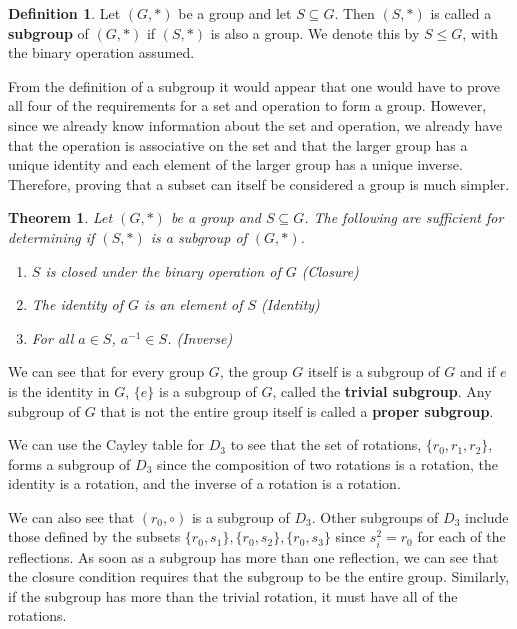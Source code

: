 \documentclass[
]{book}
\providecommand{\tightlist}{%
  \setlength{\itemsep}{0pt}\setlength{\parskip}{0pt}}
\newtheorem{theorem}{Theorem}[chapter]
\theoremstyle{definition}
\newtheorem{definition}{Definition}[chapter]
\theoremstyle{definition}
\theoremstyle{definition}
\theoremstyle{definition}
\theoremstyle{remark}
\begin{document}
\begin{definition}
Let \((G,*)\) be a group and let \(S\subseteq G\). Then \((S,*)\) is called a \textbf{subgroup} of \((G,*)\) if \((S,*)\) is also a group. We denote this by \(S \leq G\), with the binary operation assumed.
\end{definition}

From the definition of a subgroup it would appear that one would have to prove all four of the requirements for a set and operation to form a group. However, since we already know information about the set and operation, we already have that the operation is associative on the set and that the larger group has a unique identity and each element of the larger group has a unique inverse. Therefore, proving that a subset can itself be considered a group is much simpler.

\begin{theorem}

Let \((G,*)\) be a group and \(S \subseteq G\). The following are sufficient for determining if \((S,*)\) is a subgroup of \((G,*)\).

\begin{enumerate}
\def\labelenumi{\arabic{enumi}.}
\tightlist
\item
  \(S\) is closed under the binary operation of \(G\) (Closure)
\item
  The identity of \(G\) is an element of \(S\) (Identity)
\item
  For all \(a\in S\), \(a^{-1}\in S\). (Inverse)
\end{enumerate}

\end{theorem}

We can see that for every group \(G\), the group \(G\) itself is a subgroup of \(G\) and if \(e\) is the identity in \(G\), \(\{e\}\) is a subgroup of \(G\), called the \textbf{trivial subgroup}. Any subgroup of \(G\) that is not the entire group itself is called a \textbf{proper subgroup}.

We can use the Cayley table for \(D_3\) to see that the set of rotations, \(\{r_0, r_1, r_2\}\), forms a subgroup of \(D_3\) since the composition of two rotations is a rotation, the identity is a rotation, and the inverse of a rotation is a rotation.

We can also see that \(({r_0},\circ)\) is a subgroup of \(D_3\). Other subgroups of \(D_3\) include those defined by the subsets \(\{r_0,s_1\}, \{r_0, s_2\}, \{r_0, s_3\}\) since \(s_i^2=r_0\) for each of the reflections. As soon as a subgroup has more than one reflection, we can see that the closure condition requires that the subgroup to be the entire group. Similarly, if the subgroup has more than the trivial rotation, it must have all of the rotations.
\end{document}
